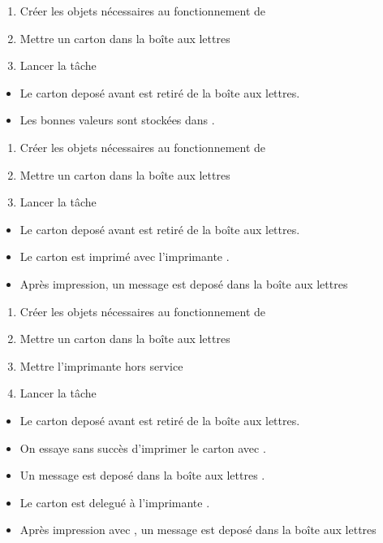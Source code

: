 {
\begin{enumerate}
	\item Créer les objets nécessaires au fonctionnement de 
	\item Mettre un carton dans la boîte aux lettres 
	\item Lancer la tâche 
\end{enumerate}
}
{
\begin{itemize}
	\item Le carton deposé avant est retiré de la boîte aux lettres.
	\item Les bonnes valeurs sont stockées dans .
\end{itemize}
}

{
\begin{enumerate}
	\item Créer les objets nécessaires au fonctionnement de 
	\item Mettre un carton dans la boîte aux lettres 
	\item Lancer la tâche 
\end{enumerate}
}
{
\begin{itemize}
	\item Le carton deposé avant est retiré de la boîte aux lettres.
	\item Le carton est imprimé avec l'imprimante .
	\item Après impression, un message  est deposé dans la boîte aux lettres 
\end{itemize}
}

{
\begin{enumerate}
	\item Créer les objets nécessaires au fonctionnement de 
	\item Mettre un carton dans la boîte aux lettres 
	\item Mettre l'imprimante  hors service
	\item Lancer la tâche 
\end{enumerate}
}
{
\begin{itemize}
	\item Le carton deposé avant est retiré de la boîte aux lettres.
	\item On essaye sans succès d'imprimer le carton avec .
	\item Un message  est deposé dans la boîte aux lettres .
	\item Le carton est delegué à l'imprimante .
	\item Après impression avec , un message  est deposé dans la boîte aux lettres 
\end{itemize}
}

